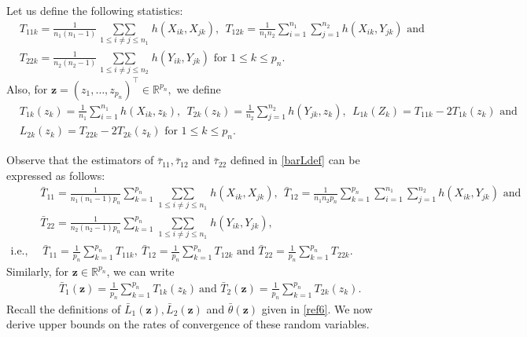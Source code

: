 \documentclass[twoside]{article}
\newcommand{\bz}{\mathbf{z}}
\newcommand{\0}{\mathbf{0}}
\newcommand{\1}{\mathbf{1}}
\numberwithin{equation}{section}
\begin{document}
Let us define the following statistics:
\begin{align}\label{compdef}
 & {T}_{11k} = \frac{1}{n_1(n_1-1)}\mathop{\sum\sum}\limits_{1\leq i\neq j\leq n_1}{h}(X_{ik},X_{jk}), \ \ {T}_{12k} =\frac{1}{n_1n_2}\sum\limits_{ i=1}^{n_1}\sum\limits_{ j=1}^{n_2}{h}(X_{ik},Y_{jk})\text{ and}\nonumber \\
 & {T}_{22k} = \frac{1}{n_2(n_2-1)}\mathop{\sum\sum}\limits_{1\leq i\neq j\leq n_2}{h}(Y_{ik},Y_{jk})\text{ for } 1\le k\le p_n.
\end{align}
Also, for $\bz=(z_1,\ldots,z_{p_n})^\top\in\mathbb{R}^{p_n},$ we define
\begin{align}\label{compdefz}
 & T_{1k}(z_k) = \frac{1}{n_1}\sum\limits_{i=1}^{n_1}h(X_{ik},z_k),\ \ T_{2k}(z_k) = \frac{1}{n_2}\sum\limits_{j=1}^{n_2}h(Y_{jk},z_k),\ \ L_{1k}(Z_k) = T_{11k} - 2T_{1k}(z_k)\text{ and }\nonumber \\
 & L_{2k}(z_k) = T_{22k} - 2T_{2k}(z_k)\text{ for } 1\le k\le p_n.
\end{align}

Observe that the estimators of $\bar{\tau}_{11},\bar{\tau}_{12}$ and $\bar{\tau}_{22}$ defined in \eqref{barLdef} can be expressed as follows:
\begin{align*}
 & \bar{T}_{11} = \frac{1}{n_1(n_1-1)p_n}\sum\limits_{k=1}^{p_n}\mathop{\sum\sum}\limits_{1\leq i\neq j\leq n_1}{h}(X_{ik},X_{jk}),\ \ \bar{T}_{12} = \frac{1}{n_1n_2 p_n}\sum\limits_{k=1}^{p_n}\sum\limits_{ i=1}^{n_1}\sum\limits_{ j=1}^{n_2}{h}(X_{ik},Y_{jk})\text{ and }\\
 & \bar{T}_{22} = \frac{1}{n_2(n_2-1)p_n}\sum\limits_{k=1}^{p_n}\mathop{\sum\sum}\limits_{1\leq i\neq j\leq n_1}{h}(Y_{ik},Y_{jk}),\\
\text{i.e., }&\ {\bar{T}}_{11} = \frac{1}{p_n}\sum\limits_{k=1}^{p_n} T_{11k},\
 {\bar{T}}_{12} = \frac{1}{p_n}\sum\limits_{k=1}^{p_n} T_{12k}\text{ and }
 {\bar{T}}_{22}  = \frac{1}{p_n}\sum\limits_{k=1}^{p_n} T_{22k}.
\end{align*}
Similarly, for $\bz\in\mathbb{R}^{p_n}$, we can write
\begin{align*}
&\ \bar{T}_{1}(\bz) = \frac{1}{p_n}\sum\limits_{k=1}^{p_n}T_{1k}(z_k)\ \text{and } \bar{T}_{2}(\bz) = \frac{1}{p_n}\sum\limits_{k=1}^{p_n}T_{2k}(z_k).
\end{align*}
Recall the definitions of $\bar{L}_1(\bz),\bar{L}_2(\bz)$ and $\bar{\theta}(\bz)$ given in \eqref{ref6}. We now derive upper bounds on the rates of convergence of these random variables. \newline
\end{document}
